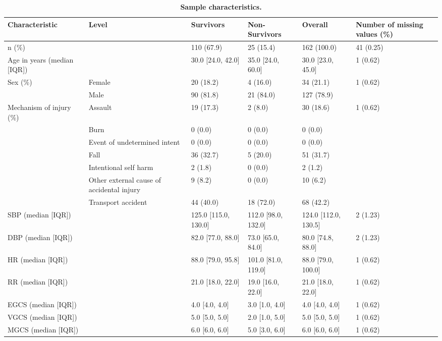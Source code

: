 \begin{table}[!ht]
\centering
\caption{\bf Sample characteristics.} 
\label{tab:sample-characteristics}
\begin{adjustbox}{max width = \linewidth} 
\begin{tabular} 
{llllll}
  \toprule
Characteristic & Level & Survivors & Non-Survivors & Overall & Number of missing values (\%) \\ 
  \midrule
n (\%) &  & 110 (67.9) & 25 (15.4) & 162 (100.0) & 41 (0.25) \\ 
  Age in years (median [IQR]) &  & 30.0 [24.0, 42.0] & 35.0 [24.0, 60.0] & 30.0 [23.0, 45.0] & 1 (0.62) \\ 
  Sex (\%) & Female & 20 (18.2) & 4 (16.0) & 34 (21.1) & 1 (0.62) \\ 
   & Male & 90 (81.8) & 21 (84.0) & 127 (78.9) &  \\ 
  Mechanism of injury (\%) & Assault & 19 (17.3) & 2 (8.0) & 30 (18.6) & 1 (0.62) \\ 
   & Burn & 0 (0.0) & 0 (0.0) & 0 (0.0) &  \\ 
   & Event of undetermined intent & 0 (0.0) & 0 (0.0) & 0 (0.0) &  \\ 
   & Fall & 36 (32.7) & 5 (20.0) & 51 (31.7) &  \\ 
   & Intentional self harm & 2 (1.8) & 0 (0.0) & 2 (1.2) &  \\ 
   & Other external cause of accidental injury & 9 (8.2) & 0 (0.0) & 10 (6.2) &  \\ 
   & Transport accident & 44 (40.0) & 18 (72.0) & 68 (42.2) &  \\ 
  SBP (median [IQR]) &  & 125.0 [115.0, 130.0] & 112.0 [98.0, 132.0] & 124.0 [112.0, 130.5] & 2 (1.23) \\ 
  DBP (median [IQR]) &  & 82.0 [77.0, 88.0] & 73.0 [65.0, 84.0] & 80.0 [74.8, 88.0] & 2 (1.23) \\ 
  HR (median [IQR]) &  & 88.0 [79.0, 95.8] & 101.0 [81.0, 119.0] & 88.0 [79.0, 100.0] & 1 (0.62) \\ 
  RR (median [IQR]) &  & 21.0 [18.0, 22.0] & 19.0 [16.0, 22.0] & 21.0 [18.0, 22.0] & 1 (0.62) \\ 
  EGCS (median [IQR]) &  & 4.0 [4.0, 4.0] & 3.0 [1.0, 4.0] & 4.0 [4.0, 4.0] & 1 (0.62) \\ 
  VGCS (median [IQR]) &  & 5.0 [5.0, 5.0] & 2.0 [1.0, 5.0] & 5.0 [5.0, 5.0] & 1 (0.62) \\ 
  MGCS (median [IQR]) &  & 6.0 [6.0, 6.0] & 5.0 [3.0, 6.0] & 6.0 [6.0, 6.0] & 1 (0.62) \\ 

\end{tabular}
\end{adjustbox}
\end{table}
